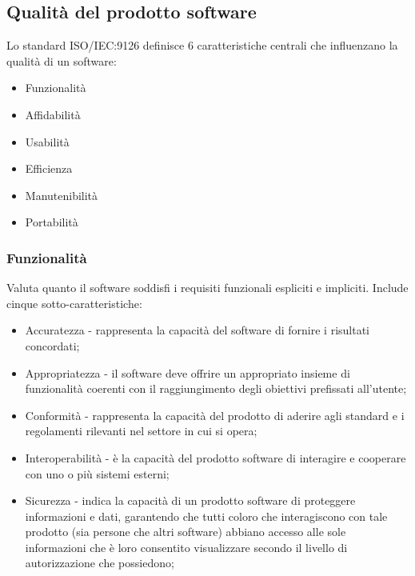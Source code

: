 \documentclass[10pt]{article}
\begin{document}
\begin{justify}
    \subsection{Qualità del prodotto software}
    Lo standard ISO/IEC:9126 definisce 6 caratteristiche centrali che influenzano la qualità di un software:
    \begin{itemize}
        \item Funzionalità
        \item Affidabilità
        \item Usabilità
        \item Efficienza
        \item Manutenibilità
        \item Portabilità
    \end{itemize}

        \subsubsection{Funzionalità}
        Valuta quanto il software soddisfi i requisiti funzionali espliciti e impliciti. Include cinque sotto-caratteristiche:
        \begin{itemize}
            \item Accuratezza - rappresenta la capacità del software di fornire i risultati concordati;
            \item Appropriatezza - il software deve offrire un appropriato insieme di funzionalità coerenti con il raggiungimento degli obiettivi prefissati all'utente;
            \item Conformità - rappresenta la capacità del prodotto di aderire agli standard e i regolamenti rilevanti nel settore in cui si opera;
            \item Interoperabilità - è la capacità del prodotto software di interagire e cooperare con uno o più sistemi esterni;
            \item Sicurezza - indica la capacità di un prodotto software di proteggere informazioni e dati, garantendo che tutti coloro che interagiscono con tale prodotto (sia persone che altri
            software) abbiano accesso alle sole informazioni che è loro consentito visualizzare secondo il livello di autorizzazione che possiedono;
        \end{itemize}


\end{justify}
\end{document}
